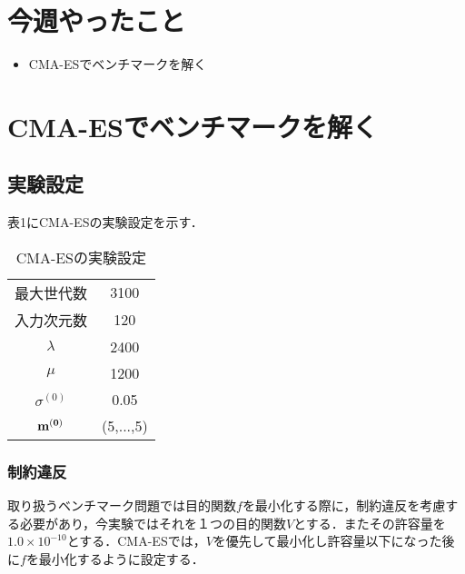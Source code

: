 \documentclass[twocolumn]{jarticle}
\begin{document}


\section{今週やったこと}
\begin{itemize}
  \item CMA-ESでベンチマークを解く
\end{itemize}

\section{CMA-ESでベンチマークを解く}
	\subsection{実験設定}
	表1にCMA-ESの実験設定を示す．
	\begin{table}[htbp]
		\begin{center}
			\caption{CMA-ESの実験設定}
			\begin{tabular}{| c | c |} \hline
				最大世代数 & 3100 \\
				入力次元数 & 120 \\
				$\lambda$ & 2400 \\
				$\mu$ & 1200 \\
				$\sigma^{(0)}$ & 0.05 \\ 
				$\bf{m}^{(0)}$ &  (5,...,5) \\ \hline
				
			\end{tabular}
		\end{center}
	\end{table}
	

	\subsubsection{制約違反}
	取り扱うベンチマーク問題では目的関数$f$を最小化する際に，制約違反を考慮する必要があり，今実験ではそれを１つの目的関数$V$とする．またその許容量を$1.0\times10^{-10}$とする．CMA-ESでは，$V$を優先して最小化し許容量以下になった後に$f$を最小化するように設定する．
	
\end{document}
